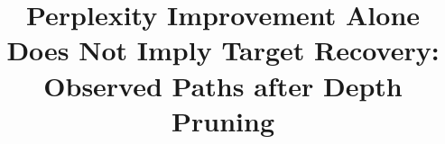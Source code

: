 \documentclass[11pt]{article}
\title{Perplexity Improvement Alone Does Not Imply Target Recovery:
Observed Paths after Depth Pruning}
\author{}
\begin{document}
\maketitle








\FloatBarrier

\FloatBarrier

\clearpage



\clearpage


\clearpage
\appendix
\raggedbottom

\end{document}
